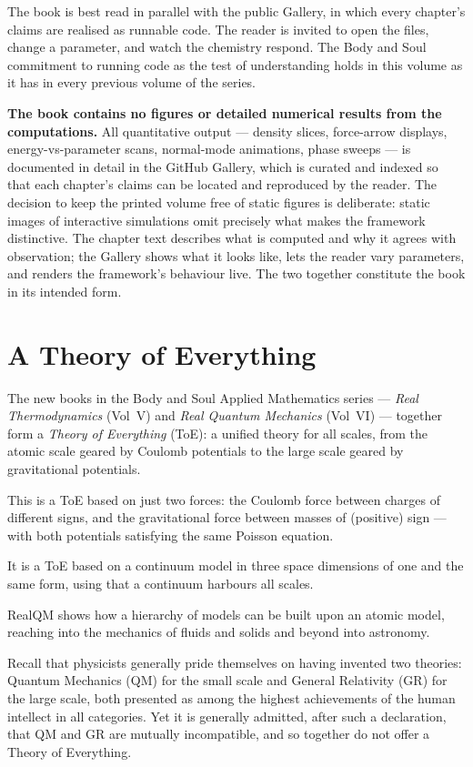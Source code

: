 The book is best read in parallel with the public Gallery, in which every chapter's claims are realised as runnable code. The reader is invited to open the files, change a parameter, and watch the chemistry respond. The Body and Soul commitment to running code as the test of understanding holds in this volume as it has in every previous volume of the series.

\textbf{The book contains no figures or detailed numerical results from the computations.} All quantitative output --- density slices, force-arrow displays, energy-vs-parameter scans, normal-mode animations, phase sweeps --- is documented in detail in the GitHub Gallery, which is curated and indexed so that each chapter's claims can be located and reproduced by the reader. The decision to keep the printed volume free of static figures is deliberate: static images of interactive simulations omit precisely what makes the framework distinctive. The chapter text describes what is computed and why it agrees with observation; the Gallery shows what it looks like, lets the reader vary parameters, and renders the framework's behaviour live. The two together constitute the book in its intended form.

\section*{A Theory of Everything}

The new books in the Body and Soul Applied Mathematics series --- \emph{Real
Thermodynamics} (Vol~V) and \emph{Real Quantum Mechanics} (Vol~VI) --- together
form a \emph{Theory of Everything} (ToE): a unified theory for all scales, from
the atomic scale geared by Coulomb potentials to the large scale geared by
gravitational potentials.

This is a ToE based on just two forces: the Coulomb force between charges of
different signs, and the gravitational force between masses of (positive) sign
--- with both potentials satisfying the same Poisson equation.

It is a ToE based on a continuum model in three space dimensions of one and the
same form, using that a continuum harbours all scales.

RealQM shows how a hierarchy of models can be built upon an atomic model,
reaching into the mechanics of fluids and solids and beyond into astronomy.

Recall that physicists generally pride themselves on having invented two
theories: Quantum Mechanics (QM) for the small scale and General Relativity
(GR) for the large scale, both presented as among the highest achievements of
the human intellect in all categories. Yet it is generally admitted, after such
a declaration, that QM and GR are mutually incompatible, and so together do not
offer a Theory of Everything.

